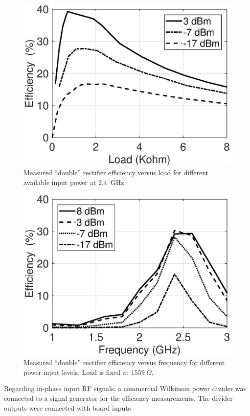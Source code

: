 \documentclass[journal]{IEEEtran}
\begin{document}
\begin{figure}[t]
\centering
\includegraphics[width=0.9\columnwidth]{Figures/Fig11.eps}
\caption{Measured ``double'' rectifier efficiency versus load for different available input power at $2.4$~GHz.}
\label{fig:eff_vs_load_double}
\end{figure}
%
\begin{figure}[t]
\centering
\includegraphics[width=0.9\columnwidth]{Figures/Fig12.eps}
\caption{Measured  ``double'' rectifier efficiency versus frequency for different power input levels. Load is fixed at $1559~\Omega$.}
\label{fig:eff_vs_freq_double}
\end{figure}
%
Regarding in-phase input RF signals, a commercial Wilkinson power divider was connected to a signal generator  for the efficiency measurements.
%
The divider outputs were connected with board inputs
\end{document}
